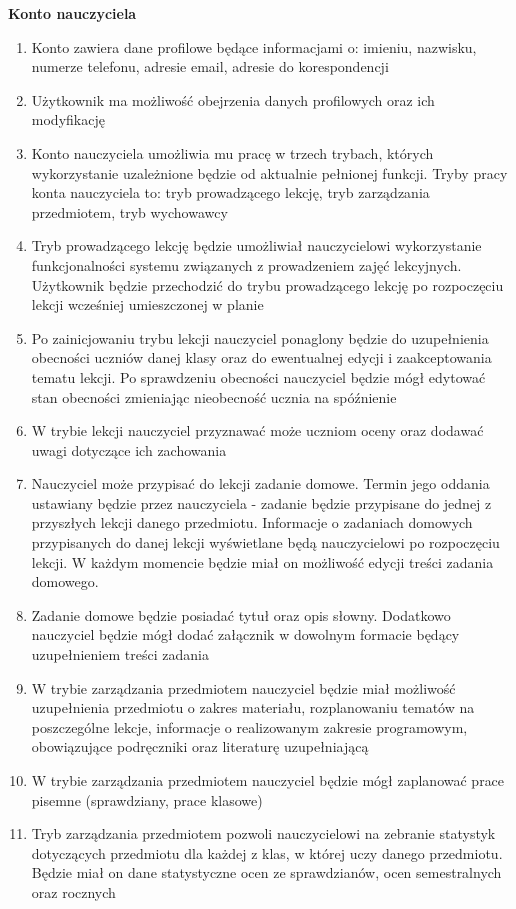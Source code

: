 \documentclass{article}
\begin{document}
\textbf{Konto nauczyciela}
\begin{enumerate}
  \item Konto zawiera dane profilowe będące informacjami o: imieniu, nazwisku, numerze telefonu, adresie email, adresie do korespondencji
  \item Użytkownik ma możliwość obejrzenia danych profilowych oraz ich modyfikację
  \item Konto nauczyciela umożliwia mu pracę w trzech trybach, których wykorzystanie uzależnione będzie od aktualnie pełnionej funkcji. Tryby pracy konta nauczyciela to: tryb prowadzącego lekcję, tryb zarządzania przedmiotem, tryb wychowawcy
  \item Tryb prowadzącego lekcję będzie umożliwiał nauczycielowi wykorzystanie funkcjonalności systemu związanych z prowadzeniem zajęć lekcyjnych. Użytkownik będzie przechodzić do trybu prowadzącego lekcję po rozpoczęciu lekcji wcześniej umieszczonej w planie
  \item Po zainicjowaniu trybu lekcji nauczyciel ponaglony będzie do uzupełnienia obecności uczniów danej klasy oraz do ewentualnej edycji i zaakceptowania tematu lekcji. Po sprawdzeniu obecności nauczyciel będzie mógł edytować stan obecności zmieniając nieobecność ucznia na spóźnienie
  \item W trybie lekcji nauczyciel przyznawać może uczniom oceny oraz dodawać uwagi dotyczące ich zachowania
  \item Nauczyciel może przypisać do lekcji zadanie domowe. Termin jego oddania ustawiany będzie przez nauczyciela - zadanie będzie przypisane do jednej z przyszłych lekcji danego przedmiotu. Informacje o zadaniach domowych przypisanych do danej lekcji wyświetlane będą nauczycielowi po rozpoczęciu lekcji. W każdym momencie będzie miał on możliwość edycji treści zadania domowego.
  \item Zadanie domowe będzie posiadać tytuł oraz opis słowny. Dodatkowo nauczyciel będzie mógł dodać załącznik w dowolnym formacie będący uzupełnieniem treści zadania
  \item W trybie zarządzania przedmiotem nauczyciel będzie miał możliwość uzupełnienia przedmiotu o zakres materiału, rozplanowaniu tematów na poszczególne lekcje, informacje o realizowanym zakresie programowym, obowiązujące podręczniki oraz literaturę uzupełniającą
  \item W trybie zarządzania przedmiotem nauczyciel będzie mógł zaplanować prace pisemne (sprawdziany, prace klasowe)
  \item Tryb zarządzania przedmiotem pozwoli nauczycielowi na zebranie statystyk dotyczących przedmiotu dla każdej z klas, w której uczy danego przedmiotu. Będzie miał on dane statystyczne ocen ze sprawdzianów, ocen semestralnych oraz rocznych

\end{enumerate}
\end{document}
